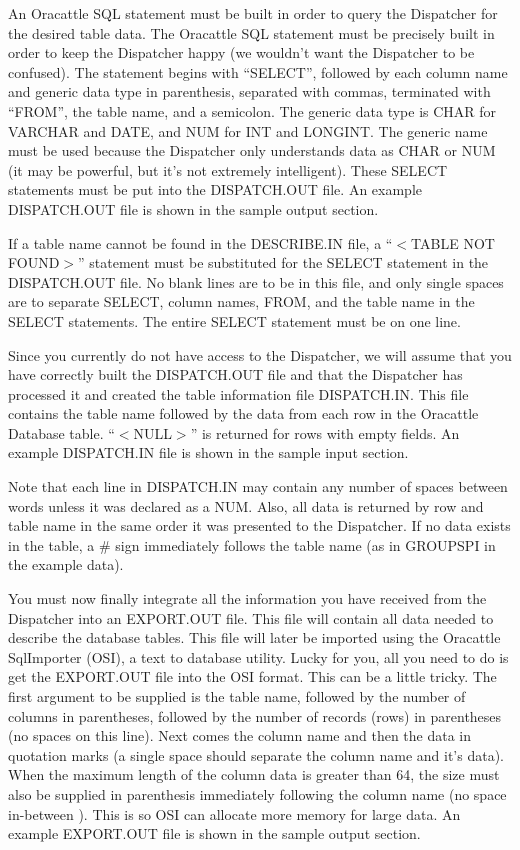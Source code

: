 An Oracattle SQL statement must be built in order to query the
Dispatcher for the desired table data.  The Oracattle SQL statement
must be precisely built in order to keep the Dispatcher happy (we
wouldn't want the Dispatcher to be confused).  The statement begins
with ``SELECT'', followed by each column name and generic data type in
parenthesis, separated with commas, terminated with ``FROM'', the
table name, and a semicolon.  The generic data type is CHAR for
VARCHAR and DATE, and NUM for INT and LONGINT.  The generic name must
be used because the Dispatcher only understands data as CHAR or NUM
(it may be powerful, but it's not extremely intelligent).  These
SELECT statements must be put into the DISPATCH.OUT file.  An example
DISPATCH.OUT file is shown in the sample output section.

If a table name cannot be found in the DESCRIBE.IN file, a ``$<$TABLE
NOT FOUND$>$'' statement must be substituted for the SELECT statement
in the DISPATCH.OUT file.  No blank lines are to be in this file, and
only single spaces are to separate SELECT, column names, FROM, and the
table name in the SELECT statements.  The entire SELECT statement must
be on one line.

Since you currently do not have access to the Dispatcher, we will
assume that you have correctly built the DISPATCH.OUT file and that
the Dispatcher has processed it and created the table information file
DISPATCH.IN.  This file contains the table name followed by the data
from each row in the Oracattle Database table.  ``$<$NULL$>$'' is
returned for rows with empty fields.  An example DISPATCH.IN file is
shown in the sample input section.

Note that each line in DISPATCH.IN may contain any number of spaces
between words unless it was declared as a NUM.  Also, all data is
returned by row and table name in the same order it was presented to
the Dispatcher.  If no data exists in the table, a \# sign immediately
follows the table name (as in GROUPSPI in the example data).

You must now finally integrate all the information you have received
from the Dispatcher into an EXPORT.OUT file.  This file will contain
all data needed to describe the database tables.  This file will later
be imported using the Oracattle SqlImporter (OSI), a text to database
utility.  Lucky for you, all you need to do is get the EXPORT.OUT file
into the OSI format.  This can be a little tricky.  The first argument
to be supplied is the table name, followed by the number of columns in
parentheses, followed by the number of records (rows) in parentheses
(no spaces on this line).  Next comes the column name and then the
data in quotation marks (a single space should separate the column
name and it's data).  When the maximum length of the column data is
greater than 64, the size must also be supplied in parenthesis
immediately following the column name (no space in-between ).  This is
so OSI can allocate more memory for large data.  An example EXPORT.OUT
file is shown in the sample output section.

